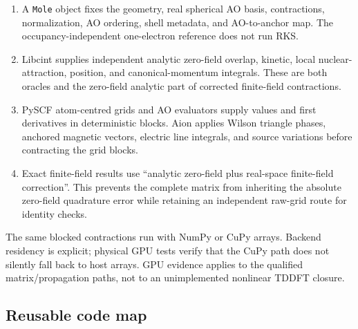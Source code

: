 \documentclass[11pt]{article}
\begin{document}
\begin{enumerate}
  \item A \texttt{Mole} object fixes the geometry, real spherical AO basis,
  contractions, normalization, AO ordering, shell metadata, and AO-to-anchor
  map.  The occupancy-independent one-electron reference does not run RKS.
  \item Libcint supplies independent analytic zero-field overlap, kinetic,
  local nuclear-attraction, position, and canonical-momentum integrals.  These
  are both oracles and the zero-field analytic part of corrected finite-field
  contractions.
  \item PySCF atom-centred grids and AO evaluators supply values and first
  derivatives in deterministic blocks.  Aion applies Wilson triangle phases,
  anchored magnetic vectors, electric line integrals, and source variations
  before contracting the grid blocks.
  \item Exact finite-field results use ``analytic zero-field plus real-space
  finite-field correction''.  This prevents the complete matrix from
  inheriting the absolute zero-field quadrature error while retaining an
  independent raw-grid route for identity checks.
\end{enumerate}

The same blocked contractions run with NumPy or CuPy arrays.  Backend
residency is explicit; physical GPU tests verify that the CuPy path does not
silently fall back to host arrays.  GPU evidence applies to the qualified
matrix/propagation paths, not to an unimplemented nonlinear TDDFT closure.

\subsection{Reusable code map}
\end{document}
